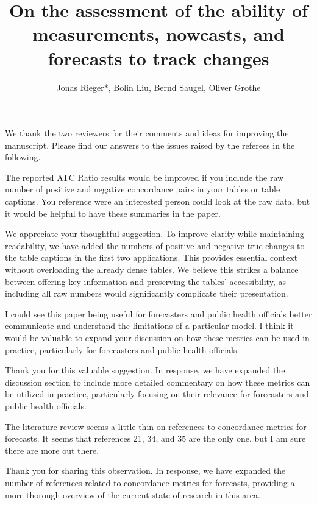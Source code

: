 \documentclass[12pt]{journalrebuttal}
\title{On the assessment of the ability of measurements, nowcasts, and forecasts to track changes}
\author{Jonas Rieger*, Bolin Liu, Bernd Saugel, Oliver Grothe}
\begin{document}
\maketitle

We thank the two reviewers for their comments and ideas for improving the manuscript. 
Please find our answers to the issues raised by the referees in the following.


\nextreviewer

\begin{revcomment}
	The reported ATC Ratio results would be improved if you include the raw number of positive and negative concordance pairs in your tables or table captions. You reference were an interested person could look at the raw data, but it would be helpful to have these summaries in the paper.
\end{revcomment}
\begin{response}
    We appreciate your thoughtful suggestion. To improve clarity while maintaining readability, we have added the numbers of positive and negative true changes to the table captions in the first two applications. This provides essential context without overloading the already dense tables. We believe this strikes a balance between offering key information and preserving the tables' accessibility, as including all raw numbers would significantly complicate their presentation.
\end{response}

\begin{revcomment}
I could see this paper being useful for forecasters and public health officials better communicate and understand the limitations of a particular model. I think it would be valuable to expand your discussion on how these metrics can be used in practice, particularly for forecasters and public health officials.
\end{revcomment}
\begin{response}
    Thank you for this valuable suggestion. In response, we have expanded the discussion section to include more detailed commentary on how these metrics can be utilized in practice, particularly focusing on their relevance for forecasters and public health officials.
\end{response}

\begin{revcomment}
The literature review seems a little thin on references to concordance metrics for forecasts. It seems that references 21, 34, and 35 are the only one, but I am sure there are more out there.
\end{revcomment}
\begin{response}
    Thank you for sharing this observation. In response, we have expanded the number of references related to concordance metrics for forecasts, providing a more thorough overview of the current state of research in this area.
\end{response}
\end{document}
